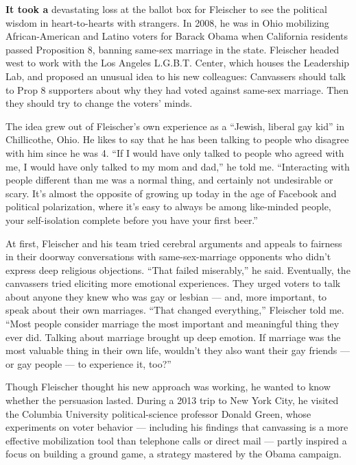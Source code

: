 \textbf{It took a} devastating loss at the ballot box for Fleischer to
see the political wisdom in heart-to-hearts with strangers. In 2008, he
was in Ohio mobilizing African-American and Latino voters for Barack
Obama when California residents passed Proposition 8, banning same-sex
marriage in the state. Fleischer headed west to work with the Los
Angeles L.G.B.T. Center, which houses the Leadership Lab, and proposed
an unusual idea to his new colleagues: Canvassers should talk to Prop 8
supporters about why they had voted against same-sex marriage. Then they
should try to change the voters' minds.

The idea grew out of Fleischer's own experience as a ``Jewish, liberal
gay kid'' in Chillicothe, Ohio. He likes to say that he has been talking
to people who disagree with him since he was 4. ``If I would have only
talked to people who agreed with me, I would have only talked to my mom
and dad,'' he told me. ``Interacting with people different than me was a
normal thing, and certainly not undesirable or scary. It's almost the
opposite of growing up today in the age of Facebook and political
polarization, where it's easy to always be among like-minded people,
your self-isolation complete before you have your first beer.''

At first, Fleischer and his team tried cerebral arguments and appeals to
fairness in their doorway conversations with same-sex-marriage opponents
who didn't express deep religious objections. ``That failed miserably,''
he said. Eventually, the canvassers tried eliciting more emotional
experiences. They urged voters to talk about anyone they knew who was
gay or lesbian --- and, more important, to speak about their own
marriages. ``That changed everything,'' Fleischer told me. ``Most people
consider marriage the most important and meaningful thing they ever did.
Talking about marriage brought up deep emotion. If marriage was the most
valuable thing in their own life, wouldn't they also want their gay
friends --- or gay people --- to experience it, too?''

Though Fleischer thought his new approach was working, he wanted to know
whether the persuasion lasted. During a 2013 trip to New York City, he
visited the Columbia Univer­sity political-science professor Donald
Green, whose experiments on voter behavior --- including his findings
that canvassing is a more effective mobilization tool than telephone
calls or direct mail --- partly inspired a focus on building a ground
game, a strategy mastered by the Obama campaign.

